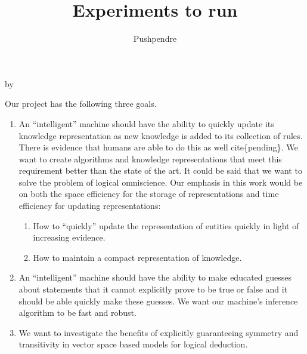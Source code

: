 \documentclass[12pt]{exam} %
\title{Experiments to run}
\author{Pushpendre}
\makeatletter
\renewcommand{\cite}[1]{cite\{#1\}}
\def\SetTotalwidth{\advance\linewidth by \@totalleftmargin
\@totalleftmargin=0pt}
\newcommand{\answer}[1]{
\ifprintanswers
\SetTotalwidth
  \begin{solution}[0in]#1\end{solution}
\else \fi
}
\makeatother
\begin{document}
\maketitle
\begin{questions}
  \answer{Our project has the following three goals.
    \begin{enumerate}
    \item An ``intelligent'' machine should have the ability to
      quickly update its knowledge representation as new knowledge is
      added to its collection of rules. There is evidence that humans
      are able to do this as well \cite{pending}. We want to create
      algorithms and knowledge representations that meet this
      requirement better than the state of the art. It could be said
      that we want to solve the problem of logical omniscience. Our
      emphasis in this work would be on both the space efficiency for
      the storage of representations and time efficiency for updating
      representations:
      \begin{enumerate}
      \item How to ``quickly'' update the representation of entities
        quickly in light of increasing evidence.
      \item How to maintain a compact representation of knowledge.
      \end{enumerate}
    \item An ``intelligent'' machine should have the ability to make
      educated guesses about statements that it cannot explicitly
      prove to be true or false and it should be able quickly make
      these guesses. We want our machine's inference algorithm to be
      fast and robust.
    \item We want to investigate the benefits of explicitly
      guaranteeing symmetry and transitivity in vector space based
      models for logical deduction.
    \end{enumerate} }


\end{questions}
\end{document}

